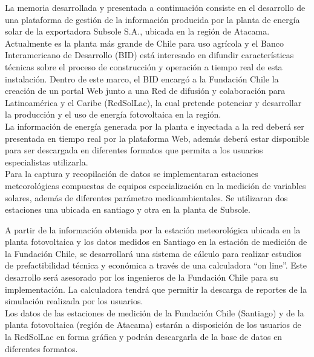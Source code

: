 La memoria desarrollada y presentada a continuación consiste en el desarrollo de una plataforma de gestión de la información producida por la planta de energía solar de la exportadora Subsole S.A., ubicada en la región de Atacama.
Actualmente es la planta más grande de Chile para uso agrícola y el Banco Interamericano de Desarrollo (BID) está interesado en difundir características técnicas sobre el proceso de construcción y operación a tiempo real de esta instalación.
Dentro de este marco, el BID encargó a la Fundación Chile la creación de un portal Web junto a una Red de difusión y colaboración para Latinoamérica y el Caribe (RedSolLac), la cual pretende potenciar y desarrollar la producción y el uso de energía fotovoltaica en la región.\\

La información de energía generada por la planta e inyectada a la red deberá ser presentada en tiempo real por la plataforma Web, además deberá estar disponible para ser descargada en diferentes formatos que permita a los usuarios especialistas utilizarla.\\

Para la captura y recopilación de datos se implementaran estaciones meteorológicas compuestas de equipos especialización en la medición de variables solares, además de diferentes parámetro medioambientales. Se utilizaran dos estaciones una ubicada en santiago y otra en la planta de Subsole.

A partir de la información obtenida por la estación meteorológica ubicada en la planta fotovoltaica y los datos medidos en Santiago en la estación de medición de la Fundación Chile, se desarrollará una sistema de cálculo para realizar estudios de prefactibilidad técnica y económica a través de una calculadora “on line”.
Este desarrollo será asesorado por los ingenieros de la Fundación Chile para su implementación.
La calculadora tendrá que permitir la descarga de reportes de la simulación realizada por los usuarios.\\

Los datos de las estaciones de medición de la Fundación Chile (Santiago) y de la planta fotovoltaica (región de Atacama) estarán a disposición de los usuarios de la RedSolLac en forma gráfica y podrán descargarla de la base de datos en diferentes formatos.
